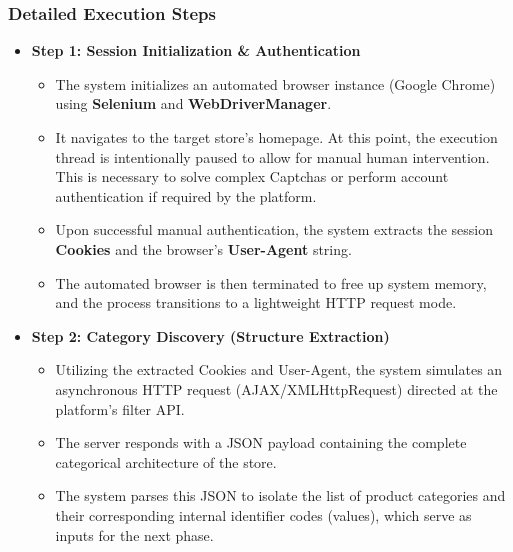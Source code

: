         \subsubsection{Detailed Execution Steps}
        \begin{itemize}
            \item \textbf{Step 1: Session Initialization \& Authentication}
            \begin{itemize}
                \item The system initializes an automated browser instance (Google Chrome) using \textbf{Selenium} and \textbf{WebDriverManager}.
                \item It navigates to the target store's homepage. At this point, the execution thread is intentionally paused to allow for manual human intervention. This is necessary to solve complex Captchas or perform account authentication if required by the platform.
                \item Upon successful manual authentication, the system extracts the session \textbf{Cookies} and the browser's \textbf{User-Agent} string.
                \item The automated browser is then terminated to free up system memory, and the process transitions to a lightweight HTTP request mode.
            \end{itemize}

            \item \textbf{Step 2: Category Discovery (Structure Extraction)}
            \begin{itemize}
                \item Utilizing the extracted Cookies and User-Agent, the system simulates an asynchronous HTTP request (AJAX/XMLHttpRequest) directed at the platform's filter API.
                \item The server responds with a JSON payload containing the complete categorical architecture of the store.
                \item The system parses this JSON to isolate the list of product categories and their corresponding internal identifier codes (values), which serve as inputs for the next phase.
            \end{itemize}


\end{itemize}
